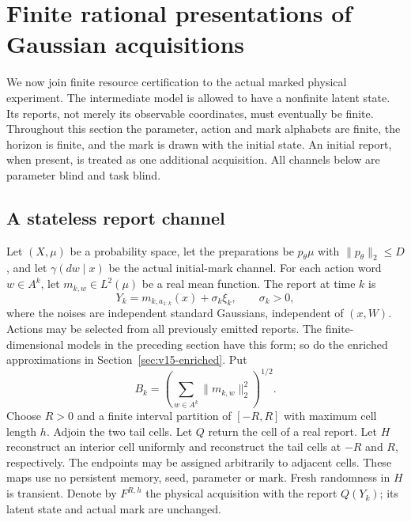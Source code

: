 \section{Finite rational presentations of Gaussian acquisitions}
\label{sec:v15-finite}
We now join finite resource certification to the actual marked physical
experiment. The intermediate model is allowed to have a nonfinite latent
state. Its reports, not merely its observable coordinates, must eventually
be finite. Throughout this section the parameter, action and mark alphabets
are finite, the horizon is finite, and the mark is drawn with the initial
state. An initial report, when present, is treated as one additional
acquisition. All channels below are parameter blind and task blind.

\subsection{A stateless report channel}
Let $(X,\mu)$ be a probability space, let the preparations be
$p_\theta\mu$ with $\|p_\theta\|_2\le D$, and let
$\gamma(dw\mid x)$ be the actual initial-mark channel. For each action
word $w\in A^k$, let $m_{k,w}\in L^2(\mu)$ be a real mean function.
The report at time $k$ is
\[
 Y_k=m_{k,a_{1:k}}(x)+\sigma_k\xi_k,\qquad \sigma_k>0,
\]
where the noises are independent standard Gaussians, independent of
$(x,W)$. Actions may be selected from all previously emitted reports.
The finite-dimensional models in the preceding section have this form;
so do the enriched approximations in Section~\ref{sec:v15-enriched}.
Put
\[
 B_k=\left(\sum_{w\in A^k}\|m_{k,w}\|_2^2\right)^{1/2}.
\]
Choose $R>0$ and a finite interval partition of $[-R,R]$ with maximum
cell length $h$. Adjoin the two tail cells. Let $Q$ return the cell of
a real report. Let $H$ reconstruct an interior cell uniformly and
reconstruct the tail cells at $-R$ and $R$, respectively. The endpoints
may be assigned arbitrarily to adjacent cells. These maps use no
persistent memory, seed, parameter or mark. Fresh randomness in $H$
is transient. Denote by $F^{R,h}$ the physical acquisition with the
report $Q(Y_k)$; its latent state and actual mark are unchanged.

